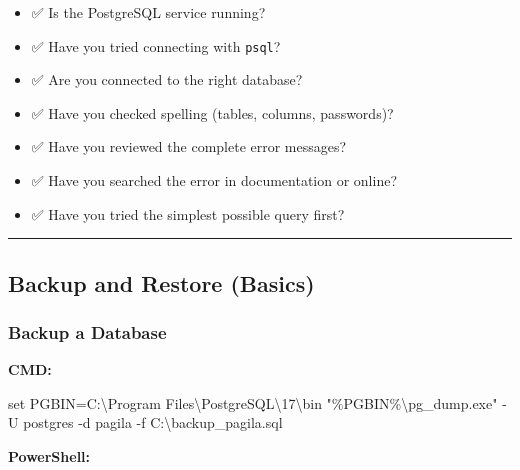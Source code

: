 \documentclass[
  letterpaper,
  DIV=11,
  numbers=noendperiod]{scrartcl}
\newenvironment{Shaded}{\begin{snugshade}}{\end{snugshade}}
\newcommand{\AttributeTok}[1]{\textcolor[rgb]{0.40,0.45,0.13}{#1}}
\newcommand{\BuiltInTok}[1]{\textcolor[rgb]{0.00,0.23,0.31}{#1}}
\newcommand{\FunctionTok}[1]{\textcolor[rgb]{0.28,0.35,0.67}{#1}}
\newcommand{\NormalTok}[1]{\textcolor[rgb]{0.00,0.23,0.31}{#1}}
\newcommand{\OperatorTok}[1]{\textcolor[rgb]{0.37,0.37,0.37}{#1}}
\newcommand{\PreprocessorTok}[1]{\textcolor[rgb]{0.68,0.00,0.00}{#1}}
\newcommand{\StringTok}[1]{\textcolor[rgb]{0.13,0.47,0.30}{#1}}
\newcommand{\VariableTok}[1]{\textcolor[rgb]{0.07,0.07,0.07}{#1}}
\providecommand{\tightlist}{%
  \setlength{\itemsep}{0pt}\setlength{\parskip}{0pt}}\usepackage{longtable,booktabs,array}
\begin{document}
\begin{itemize}
\tightlist
\item
  ✅ Is the PostgreSQL service running?
\item
  ✅ Have you tried connecting with \texttt{psql}?
\item
  ✅ Are you connected to the right database?
\item
  ✅ Have you checked spelling (tables, columns, passwords)?
\item
  ✅ Have you reviewed the complete error messages?
\item
  ✅ Have you searched the error in documentation or online?
\item
  ✅ Have you tried the simplest possible query first?
\end{itemize}

\begin{center}\rule{0.5\linewidth}{0.5pt}\end{center}

\subsection{Backup and Restore
(Basics)}\label{backup-and-restore-basics}

\subsubsection{Backup a Database}\label{backup-a-database}

\textbf{CMD:}

\begin{Shaded}
\begin{Highlighting}[]
\BuiltInTok{set} \VariableTok{PGBIN}\NormalTok{=C:\textbackslash{}Program Files\textbackslash{}PostgreSQL\textbackslash{}17\textbackslash{}bin}
\StringTok{"}\PreprocessorTok{\%}\VariableTok{PGBIN}\PreprocessorTok{\%}\StringTok{\textbackslash{}pg\_dump.exe"}\NormalTok{ {-}U postgres }\AttributeTok{{-}d}\NormalTok{ pagila }\AttributeTok{{-}f}\NormalTok{ C:\textbackslash{}backup\_pagila.sql}
\end{Highlighting}
\end{Shaded}

\textbf{PowerShell:}

\begin{Shaded}
\end{Shaded}
\end{document}
